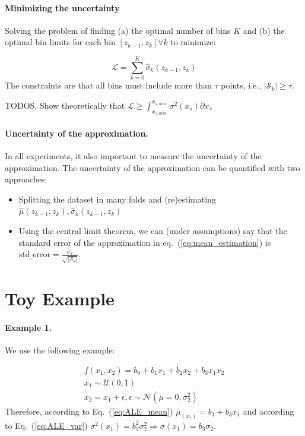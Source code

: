\documentclass{article}
\begin{document}
\paragraph{Minimizing the uncertainty}

Solving the problem of finding (a) the optimal number of bins \(K\) and (b) the optimal bin limits for each bin \([z_{k-1}, z_k] \forall k\) to minimize:

\begin{equation}
  \label{eq:1}
  \mathcal{L} = \sum_{k=0}^K \hat{\sigma}_k(z_{k-1}, z_k)
\end{equation}
%
The constraints are that all bins must include more than \(\tau\)
points, i.e., \(|\mathcal{S}_k| \geq \tau\).

\noindent
TODOS. Show theoretically that \(\mathcal{L} \geq \int_{x_{s, min}}^{x_{s, max}}\sigma^2(x_s) \partial x_s\)

\paragraph{Uncertainty of the approximation.}

In all experiments, it also important to measure the uncertainty of
the approximation. The uncertainty of the approximation can be
quantified with two approaches:

\begin{itemize}
\item Splitting the dataset in many folds and (re)estimating
  \(\hat{\mu}(z_{k-1}, z_k), \hat{\sigma}_k(z_{k-1}, z_k)\)
\item Using the central limit theorem, we can (under assumptions) say
  that the standard error of the approximation in
  eq.~(\ref{eq:mean_estimation}) is
  \(\mathrm{std\_error} =
  \frac{\hat{\sigma}_k}{\sqrt{|\mathcal{S}_k|}}\).
\end{itemize}

\section{Toy Example}

\paragraph{Example 1.} We use the following example:

\begin{equation}
  \label{eq:model_1}
  \begin{gathered}
    f(x_1, x_2) = b_0 + b_1 x_1 + b_2 x_2 + b_3 x_1 x_2\\
    x_1 \sim \mathcal{U}(0,1) \\
    x_2 = x_1 + \epsilon, \epsilon \sim \mathcal{N}(\mu=0, \sigma_2^2)
  \end{gathered}
\end{equation}
%
Therefore, according to Eq.~(\ref{eq:ALE_mean})
\(\mu_(x_1) = b_1 + b_3 x_1\) and according to Eq.~(\ref{eq:ALE_var})
\(\sigma^2(x_1) = b_3^2 \sigma_2^2 \Rightarrow \sigma(x_1) = b_3
\sigma_2 \).
\end{document}
